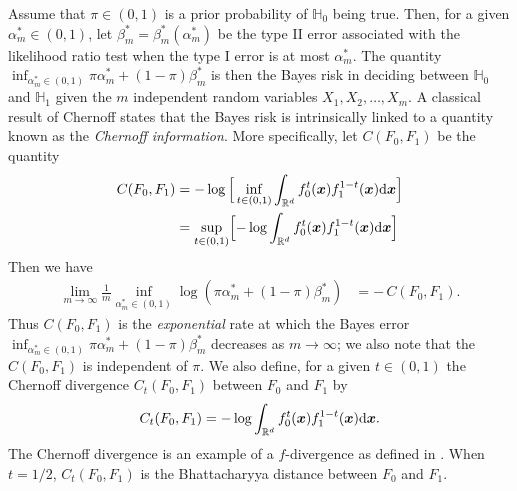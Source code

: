 \documentclass[11pt]{extarticle}
\begin{document}
Assume that $\pi \in (0,1)$ is a prior probability of $\mathbb{H}_0$ being true. Then, for a given $\alpha_m^{*} \in (0,1)$, let $\beta_m^{*} = \beta_m^{*}(\alpha_m^{*})$ be the type II error associated with the likelihood ratio test when the type I error is at most $\alpha_m^{*}$. The quantity $\inf_{\alpha_m^{*} \in (0,1)} \pi \alpha_m^{*} + (1 - \pi) \beta_m^{*}$
is then the Bayes risk in deciding between $\mathbb{H}_0$ and $\mathbb{H}_1$ given the $m$ independent random variables $X_1, X_2, \dots, X_m$. A classical result of Chernoff \cite{chernoff_1952} states that the Bayes risk is intrinsically linked to a quantity known as the {\em Chernoff information}. More specifically, let $C(F_0, F_1)$ be the quantity
\begin{equation}
\label{eq:chernoff-defn}
\begin{split} C(F_0, F_1) & = - \log \, \Bigl[\, \inf_{t \in (0,1)} \int_{\mathbb{R}^{d}} f_0^{t}(\boldsymbol{x}) f_1^{1-t}(\boldsymbol{x}) \mathrm{d}\boldsymbol{x} \Bigr] \\
&= \sup_{t \in (0,1)} \Bigl[ - \log \int_{\mathbb{R}^{d}} f_0^{t}(\boldsymbol{x}) f_1^{1-t}(\boldsymbol{x}) \mathrm{d}\boldsymbol{x} \Bigr]
\end{split}
\end{equation}
Then we have
\begin{equation}
\label{eq:chernoff-binary}
\begin{split}
\lim_{m \rightarrow \infty} \frac{1}{m} \inf_{\alpha_m^{*} \in (0,1)} \log( \pi \alpha_m^{*} + (1 - \pi) \beta_m^{*}) & = - \, C(F_0, F_1).
\end{split}
\end{equation}
Thus $C(F_0, F_1)$ is the {\em exponential} rate at which the Bayes error $\inf_{\alpha_m^{*} \in (0,1)} \pi \alpha_m^{*} + (1 - \pi) \beta_m^{*}$ decreases as $m \rightarrow \infty$; we also note that the $C(F_0, F_1)$ is independent of $\pi$. We also define, for a given $t \in (0,1)$ the Chernoff divergence $C_t(F_0, F_1) $ between $F_0$ and $F_1$ by
$$ C_{t}(F_0,F_1) = - \log \int_{\mathbb{R}^{d}} f_0^{t}(\boldsymbol{x}) f_1^{1-t}(\boldsymbol{x}) \mathrm{d}\boldsymbol{x}. $$
The Chernoff divergence is an example of a $f$-divergence as defined in \cite{Csizar}. When $t = 1/2$, $C_t(F_0,F_1)$ is the Bhattacharyya distance between $F_0$ and $F_1$.
\end{document}
